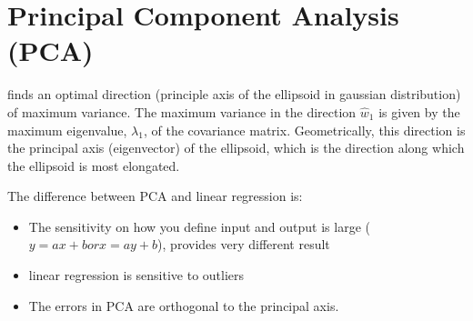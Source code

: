 \documentclass[a4paper,10pt]{article}
\begin{document}
\section{Principal Component Analysis (PCA)}
finds an optimal direction (principle axis of the ellipsoid in gaussian distribution) of maximum variance. The maximum variance in the direction $\hat{w}_1$ is given by the maximum eigenvalue, $\lambda_1$, of the covariance matrix. Geometrically, this direction is the principal axis (eigenvector) of the ellipsoid, which is the direction along which the ellipsoid is most elongated.\par 

The difference between PCA and linear regression is:
\begin{itemize}
    \item The sensitivity on how you define input and output is large ($y=ax+b or x = ay+b$), provides very different result
    \item linear regression is sensitive to outliers
    \item The errors in PCA are orthogonal to the principal axis.
\end{itemize}

\end{document}

